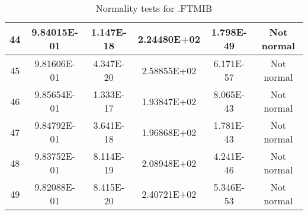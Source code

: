 \begin{table}[h]
\begin{tabular}{|c|c|c|c|c|c|}
		44 & 9.84015E-01 & 1.147E-18 & 2.24480E+02 & 1.798E-49 & Not normal\\\hline
		45 & 9.81606E-01 & 4.347E-20 & 2.58855E+02 & 6.171E-57 & Not normal\\\hline
		46 & 9.85654E-01 & 1.333E-17 & 1.93847E+02 & 8.065E-43 & Not normal\\\hline
		47 & 9.84792E-01 & 3.641E-18 & 1.96868E+02 & 1.781E-43 & Not normal\\\hline
		48 & 9.83752E-01 & 8.114E-19 & 2.08948E+02 & 4.241E-46 & Not normal\\\hline
		49 & 9.82088E-01 & 8.415E-20 & 2.40721E+02 & 5.346E-53 & Not normal\\\hline
	\end{tabular}
	\caption{Normality tests for .FTMIB}
	\label{tab:normality_tests_FTMIB}
\end{table}
